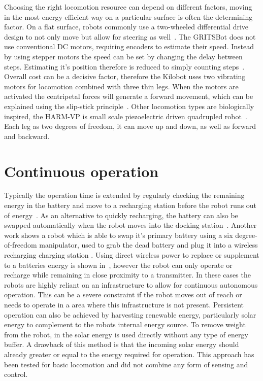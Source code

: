 Choosing the right locomotion resource can depend on different factors, moving in the most energy efficient way on a particular surface is often the determining factor.
On a flat surface, robots commonly use a two-wheeled differential drive design to not only move but allow for steering as well~\cite{sabelhaus_icra_2013, pickem_icra_2015}.
The GRITSBot does not use conventional DC motors, requiring encoders to estimate their speed. 
Instead by using stepper motors the speed can be set by changing the delay between steps. 
Estimating it's position therefore is reduced to simply counting steps~\cite{pickem_icra_2015}.  
Overall cost can be a decisive factor, therefore the Kilobot uses two vibrating motors for locomotion combined with three thin legs.
When the motors are activated the centripetal forces will generate a forward movement, which can be explained using the slip-stick principle~\cite{rubenstein_icra_2012}.
Other locomotion types are biologically inspired, the HARM-VP is small scale piezoelectric driven quadrupled robot~\cite{baisch_iros_2013}.
Each leg as two degrees of freedom, it can move up and down, as well as forward and backward.

\section{Continuous operation} 

Typically the operation time is extended by regularly checking the remaining energy in the battery and move to a recharging station before the robot runs out of energy~\cite{pickem_icra_2015, rubenstein_icra_2012}.
As an alternative to quickly recharging, the battery can also be swapped automatically when the robot moves into the docking station~\cite{kemal_mech_2015}.
Another work shows a robot which is able to swap it's primary battery using a six degree-of-freedom manipulator, used to grab the dead battery and plug it into a wireless recharging charging station \cite{zhang_conel_2013}.
Using direct wireless power to replace or supplement to a batteries energy is shown in~\cite{karpelson_icra_2014}, however the robot can only operate or recharge while remaining in close proximity to a transmitter. 
In these cases the robots are highly reliant on an infrastructure to allow for continuous autonomous operation.
This can be a severe constraint if the robot moves out of reach or needs to operate in a area where this infrastructure is not present. Persistent operation can also be achieved by harvesting renewable energy, particularly solar energy to complement to the robots internal energy source. To remove weight from the robot, in \cite{bruhwiler_iros_2015} the solar energy is used directly without any type of energy buffer. A drawback of this method is that the incoming solar energy should already greater or equal to the energy required for operation. This approach has been tested for basic locomotion and did not combine any form of sensing and control.

